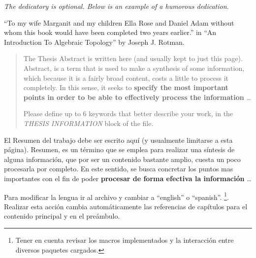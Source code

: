 

\begin{dedicatory}
\itshape
The dedicatory is optional. Below is an example of a humorous dedication.

\enquote{To my wife Marganit and my children Ella Rose and Daniel Adam without whom this book would have been completed two years earlier.} in \enquote{An Introduction To Algebraic Topology} by Joseph J. Rotman.

\end{dedicatory}


\begin{abstract}

The Thesis Abstract is written here (and usually kept to just this page). Abstract, is a term that is used to make a synthesis of some information, which because it is a fairly broad content, costs a little to process it completely. In this sense, it seeks to {\bfseries specify the most important points in order to be able to effectively process the information} \ldots

Please define up to 6 keywords that better describe your work, in the \emph{THESIS INFORMATION} block of the  file.

\end{abstract}

\begin{abstractotherlanguage}

El Resumen del trabajo debe ser escrito aquí (y usualmente limitarse a esta página). Resumen, es un término que se emplea para realizar una síntesis de alguna información, que por ser un contenido bastante amplio, cuesta un poco procesarla por completo. En este sentido, se busca concretar los puntos mas importantes con el fin de poder {\bfseries procesar de forma efectiva la información} \ldots

Para modificar la lengua ir al archivo  y cambiar a \enquote{english} o \enquote{spanish}. \footnote{Tener en cuenta revisar los macros implementados y la interacción entre diversos paquetes cargados.}. Realizar esta acción cambia automáticamente las referencias de capítulos para el contenido principal y en el preámbulo.

\end{abstractotherlanguage}


